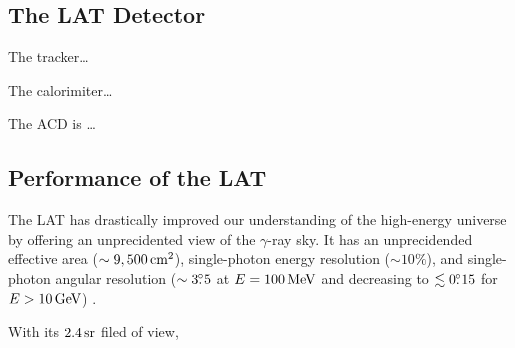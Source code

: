 
\subsection{The LAT Detector}

The tracker\ldots

The calorimiter\ldots

The \Ac{ACD} is \ldots


\subsection{Performance of the \acs{LAT}}

The \ac{LAT} has drastically improved our understanding of the high-energy
universe by offering an unprecidented view of the $\gamma$-ray sky.
It has an unprecidended effective area ($\sim9,500\,\text{cm}^2$),
single-photon energy resolution ($\sim10\%$), and single-photon
angular resolution ($\sim3\mbox{$.\!\!^\circ$}5$ at $E=100\,\text{MeV}$
and decreasing to $\lesssim0\mbox{$.\!\!^\circ$}15$ for $E>10\,\text{GeV}$)
\citep{atwood_2009a_large-telescope}.

With its $2.4\,\text{sr}$ filed of view,

